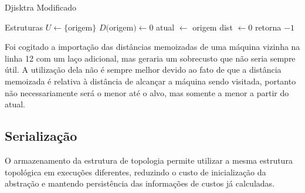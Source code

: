 \begin{algorithm}[t]
\caption{Djisktra Modificado}
\label{alg:dists}
    \DontPrintSemicolon
     {Estruturas}
                \BlankLine
    $U \leftarrow \{$origem$\}$\;
    $D($origem$) \leftarrow {0}$\;
    atual $\leftarrow$ origem  
    dist $\leftarrow 0$  
    retorna $-1$ 
\end{algorithm}

Foi cogitado a importação das distâncias memoizadas de uma máquina vizinha na linha 12 com um laço adicional, mas geraria um sobrecusto que não seria sempre útil.
A utilização dela não é sempre melhor devido ao fato de que a distância memoizada é relativa à distância de alcançar a máquina sendo visitada, portanto não necessariamente será o menor até o alvo, mas somente a menor a partir do atual.


\subsection{Serialização}
\label{sec:xml}

O armazenamento da estrutura de topologia permite utilizar a mesma estrutura topológica em execuções diferentes, reduzindo o custo de inicialização da abstração e mantendo persistência das informações de custos já calculadas.

